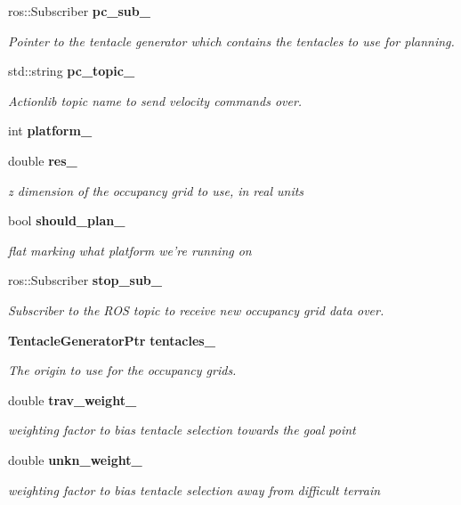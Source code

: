 \begin{DoxyCompactItemize}
ros\-::\-Subscriber {\bf pc\-\_\-sub\-\_\-}
\begin{DoxyCompactList}\small\item\em \-Pointer to the tentacle generator which contains the tentacles to use for planning. \end{DoxyCompactList}\item 
std\-::string {\bf pc\-\_\-topic\-\_\-}
\begin{DoxyCompactList}\small\item\em \-Actionlib topic name to send velocity commands over. \end{DoxyCompactList}\item 
int {\bf platform\-\_\-}
\item 
double {\bf res\-\_\-}
\begin{DoxyCompactList}\small\item\em z dimension of the occupancy grid to use, in real units \end{DoxyCompactList}\item 
bool {\bf should\-\_\-plan\-\_\-}
\begin{DoxyCompactList}\small\item\em flat marking what platform we're running on \end{DoxyCompactList}\item 
ros\-::\-Subscriber {\bf stop\-\_\-sub\-\_\-}
\begin{DoxyCompactList}\small\item\em \-Subscriber to the \-R\-O\-S topic to receive new occupancy grid data over. \end{DoxyCompactList}\item 
{\bf \-Tentacle\-Generator\-Ptr} {\bf tentacles\-\_\-}
\begin{DoxyCompactList}\small\item\em \-The origin to use for the occupancy grids. \end{DoxyCompactList}\item 
double {\bf trav\-\_\-weight\-\_\-}
\begin{DoxyCompactList}\small\item\em weighting factor to bias tentacle selection towards the goal point \end{DoxyCompactList}\item 
double {\bf unkn\-\_\-weight\-\_\-}
\begin{DoxyCompactList}\small\item\em weighting factor to bias tentacle selection away from difficult terrain \end{DoxyCompactList}\item 

\end{DoxyCompactItemize}
